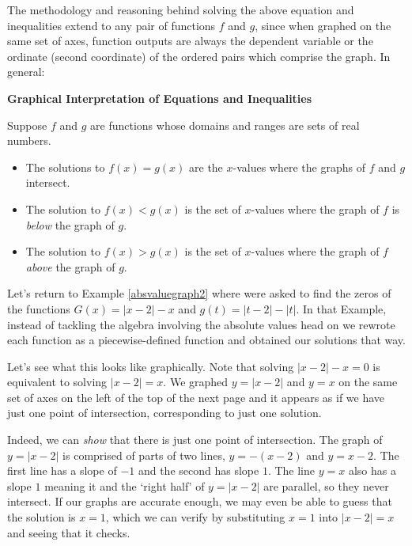 The methodology and reasoning behind solving the above equation and inequalities extend to any pair of functions $f$ and $g$, since when graphed on the same set of axes, function outputs are always the dependent variable or the ordinate (second coordinate) of the ordered pairs which comprise the graph.  In general:

\medskip

\colorbox{ResultColor}{\bbm

\centerline{\textbf{Graphical Interpretation of Equations and Inequalities}}

\medskip

Suppose $f$ and $g$ are functions whose domains and ranges are sets of real numbers.

\begin{itemize}

\item  The solutions to $f(x)=g(x)$ are the $x$-values where the graphs of $f$ and $g$ intersect.

\item  The solution to $f(x) < g(x)$ is the set of $x$-values where the graph of $f$ is \textit{below} the graph of $g$.

\item  The solution to $f(x) > g(x)$ is the set of $x$-values where the graph of $f$ \textit{above} the graph of $g$.

\end{itemize}

\ebm}

\medskip

Let's return to  Example \ref{absvaluegraph2} where were asked to find the zeros of the functions $G(x) = |x-2| -x$ and $g(t) = |t-2|-|t|$. In that Example, instead of tackling the algebra involving the absolute values head on we rewrote each function as a piecewise-defined function and obtained our solutions that way.  

\medskip

Let's see what this looks like graphically.  Note that solving $|x-2|-x=0$ is equivalent to solving $|x-2|=x$.  We graphed $y = |x-2|$ and $y=x$ on the same set of axes on the left of the top of the next page and it appears as if we have just one point of intersection, corresponding to just one solution. 

\medskip

Indeed, we can \textit{show} that there is just one point of intersection.  The graph of  $y = |x-2|$ is comprised of parts of two lines, $y =-(x-2)$ and $y = x-2$. The first line has a slope of $-1$ and the second has slope $1$.  The line $y = x$ also has a slope $1$ meaning it and the `right half' of $y =|x-2|$  are parallel, so they never intersect.  If our graphs are accurate enough, we may even be able to guess that the solution is $x = 1$, which we can verify by  substituting $x = 1$ into $|x-2| = x$ and seeing that it checks.  

